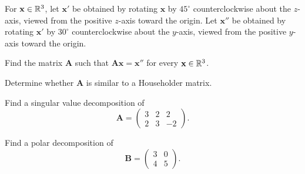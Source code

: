 \begin{problem}
For $\mathbf x\in\mathbb{R}^3$, let $\mathbf x'$ be obtained by rotating $\mathbf x$ by $45^\circ$ counterclockwise about the $z$-axis, viewed from the positive $z$-axis toward the origin. Let $\mathbf x''$ be obtained by rotating $\mathbf x'$ by $30^\circ$ counterclockwise about the $y$-axis, viewed from the positive $y$-axis toward the origin.
\begin{problemsubparts}
\item Find the matrix $\mathbf A$ such that $\mathbf A\mathbf x=\mathbf x''$ for every $\mathbf x\in\mathbb{R}^3$.
\item Determine whether $\mathbf A$ is similar to a Householder matrix.
\end{problemsubparts}
\end{problem}

\begin{problem}
\begin{problemsubparts}
\item Find a singular value decomposition of
\[
\mathbf A=
\begin{pmatrix}
3&2&2\\
2&3&-2
\end{pmatrix}.
\]
\item Find a polar decomposition of
\[
\mathbf B=
\begin{pmatrix}
3&0\\
4&5
\end{pmatrix}.
\]
\end{problemsubparts}
\end{problem}

